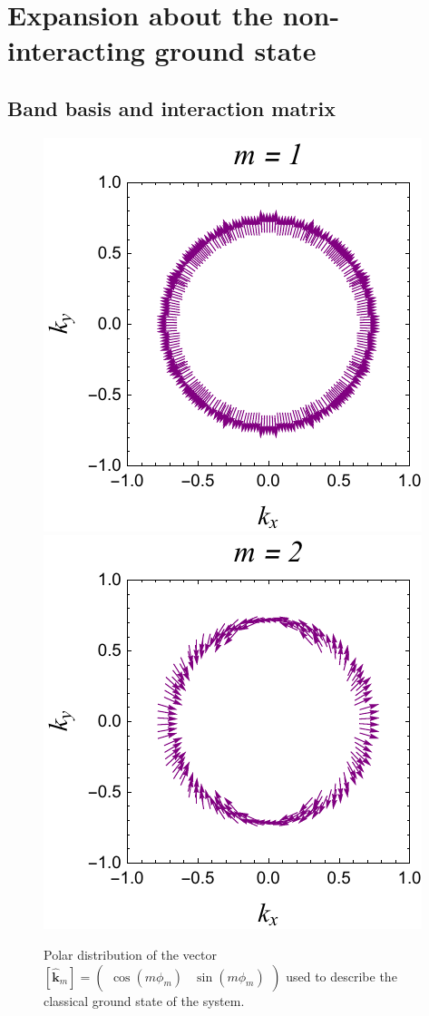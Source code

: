 \documentclass[english,aps,prd,nofootinbib,twocolumn]{revtex4-1}
\begin{document}
\section{Expansion about the non-interacting ground state}


\subsection{Band basis and interaction matrix}
\label{sect:Supp:Band-basis}

\begin{figure}
\centering
\includegraphics[scale=0.6]{1Layer.pdf}
\includegraphics[scale=0.6]{2Layer.pdf}
\caption{Polar distribution of the vector $[\hat{\mathbf{k}}_{m}]= 
\begin{pmatrix}
\cos(m\phi_{m})	&	\!\!\sin(m\phi_{m})
\end{pmatrix}$ used to describe the classical ground state of the system.}
\label{fig:Classical-gound-state}
\end{figure}
\end{document}
